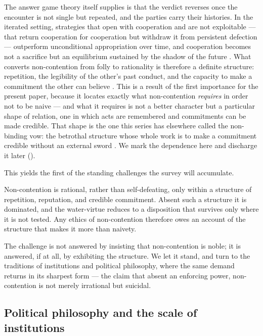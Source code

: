 The answer game theory itself supplies is that the verdict reverses once the encounter is not single but repeated, and the parties carry their histories. In the iterated setting, strategies that open with cooperation and are not exploitable --- that return cooperation for cooperation but withdraw it from persistent defection --- outperform unconditional appropriation over time, and cooperation becomes not a sacrifice but an equilibrium sustained by the shadow of the future \parencite{axelrod1984}. What converts non-contention from folly to rationality is therefore a definite structure: repetition, the legibility of the other's past conduct, and the capacity to make a commitment the other can believe \parencite{schelling1960}. This is a result of the first importance for the present paper, because it locates exactly what non-contention \emph{requires} in order not to be naive --- and what it requires is not a better character but a particular shape of relation, one in which acts are remembered and commitments can be made credible. That shape is the one this series has elsewhere called the non-binding vow: the betrothal structure whose whole work is to make a commitment credible without an external sword \parencite{paperxiii}. We mark the dependence here and discharge it later ().

This yields the first of the standing challenges the survey will accumulate.

\begin{claim}
Non-contention is rational, rather than self-defeating, only within a structure of repetition, reputation, and credible commitment. Absent such a structure it is dominated, and the water-virtue reduces to a disposition that survives only where it is not tested. Any ethics of non-contention therefore owes an account of the structure that makes it more than naivety.
\end{claim}

\noindent
The challenge is not answered by insisting that non-contention is noble; it is answered, if at all, by exhibiting the structure. We let it stand, and turn to the traditions of institutions and political philosophy, where the same demand returns in its sharpest form --- the claim that absent an enforcing power, non-contention is not merely irrational but suicidal.


\subsection{Political philosophy and the scale of institutions}
\label{p20:sub:review-polphil}

